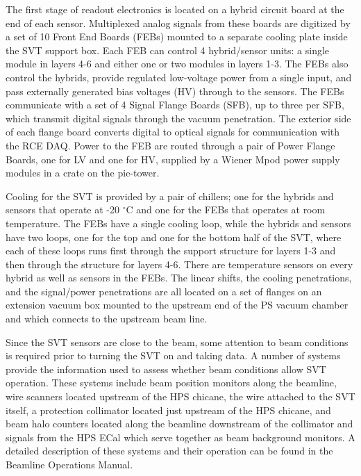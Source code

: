 \documentclass[12pt]{report}
\begin{document}
The first stage of readout electronics is located on a hybrid circuit board at the end of each sensor.  Multiplexed analog signals from these boards are digitized by a set of 10 Front End Boards (FEBs) mounted to a separate cooling plate inside the SVT support box. Each FEB can control 4 hybrid/sensor units: a single module in layers 4-6 and either one or two modules in layers 1-3. The FEBs also control the hybrids, provide regulated low-voltage power from a single input, and pass externally generated bias voltages (HV) through to the sensors.   The FEBs communicate with a set of 4 Signal Flange Boards (SFB), up to three per SFB, which transmit digital signals through the vacuum penetration.  The exterior side of each flange board converts digital to optical signals for communication with the RCE DAQ.  Power to the FEB are routed through a pair of Power Flange Boards, one for LV and one for HV, supplied by a Wiener Mpod power supply modules in a crate on the pie-tower.

Cooling for the SVT is provided by a pair of chillers; one for the hybrids and sensors that operate at -20 $^\circ$C and one for the FEBs that operates at room temperature.  The FEBs have a single cooling loop, while the hybrids and sensors have two loops, one for the top and one for the bottom half of the SVT, where each of these loops runs first through the support structure for layers 1-3 and then through the structure for layers 4-6.  There are temperature sensors on every hybrid as well as sensors in the FEBs. The linear shifts, the cooling penetrations, and the signal/power penetrations are all located on a set of flanges on an extension vacuum box mounted to the upstream end of the PS vacuum chamber and which connects to the upstream beam line.

Since the SVT sensors are close to the beam, some attention to beam conditions is required prior to turning the SVT on and taking data. A number of systems provide the information used to assess whether beam conditions allow SVT operation. These systems include beam position monitors along the beamline, wire scanners located upstream of the HPS chicane, the wire attached to the SVT itself, a protection collimator located just upstream of the HPS chicane, and beam halo counters located along the beamline downstream of the collimator and signals from the HPS ECal which serve together as beam background monitors.  A detailed description of these systems and their operation can be found in the Beamline Operations Manual.
\end{document}
